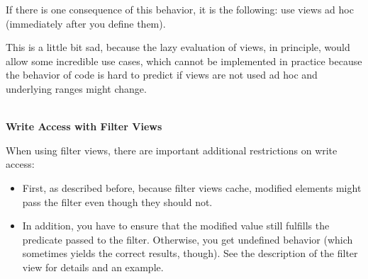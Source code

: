 If there is one consequence of this behavior, it is the following: use views ad hoc (immediately after you define them).

This is a little bit sad, because the lazy evaluation of views, in principle, would allow some incredible use cases, which cannot be implemented in practice because the behavior of code is hard to predict if views are not used ad hoc and underlying ranges might change.

\noindent
\hspace*{\fill} \\ %
\textbf{Write Access with Filter Views}

When using filter views, there are important additional restrictions on write access:

\begin{itemize}
\item
First, as described before, because filter views cache, modified elements might pass the filter even though they should not.

\item
In addition, you have to ensure that the modified value still fulfills the predicate passed to the filter. Otherwise, you get undefined behavior (which sometimes yields the correct results, though). See the description of the filter view for details and an example.
\end{itemize}

